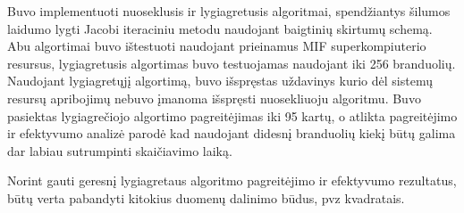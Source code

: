 \documentclass{VUMIFPSbakalaurinis}
\begin{document}




Buvo implementuoti nuoseklusis ir lygiagretusis algoritmai, spendžiantys šilumos laidumo lygti Jacobi iteraciniu metodu naudojant baigtinių skirtumų schemą.
Abu algortimai buvo ištestuoti naudojant prieinamus MIF superkompiuterio resursus, lygiagretusis algortimas buvo testuojamas naudojant iki 256 branduolių.
Naudojant lygiagretųjį algortimą, buvo išspręstas uždavinys kurio dėl sistemų resursų apribojimų nebuvo įmanoma išspręsti nuosekliuoju algoritmu. 
Buvo pasiektas lygiagrečiojo algortimo pagreitėjimas iki 95 kartų, o atlikta pagreitėjimo ir efektyvumo analizė parodė kad naudojant didesnį branduolių kiekį būtų galima dar labiau sutrumpinti skaičiavimo laiką.

Norint gauti geresnį lygiagretaus algoritmo pagreitėjimo ir efektyvumo rezultatus, būtų verta pabandyti kitokius duomenų dalinimo būdus, pvz kvadratais.
\end{document}
